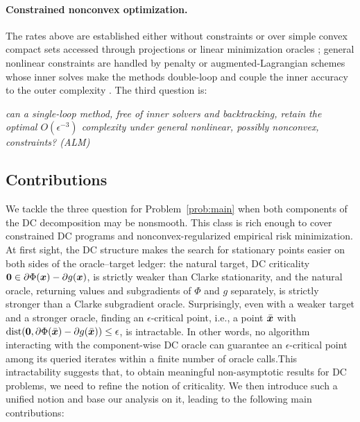 \documentclass[english]{article}
\begin{document}
\paragraph{Constrained nonconvex optimization.}
The rates above are established either without constraints or over
simple convex compact sets accessed through projections or linear
minimization oracles \citep{khamaru2018convergence,maskan2025}; general nonlinear
constraints are handled by penalty or augmented-Lagrangian schemes
whose inner solves make the methods double-loop and couple the inner
accuracy to the outer complexity
\citep{xie2021complexity,lu2022penalty,yu2021convergence,kanzow2025adaptive}. The third question is:

\emph{can a single-loop method, free of inner solvers and
backtracking, retain the optimal $O(\epsilon^{-3})$ complexity under general
nonlinear, possibly nonconvex, constraints? (ALM)}

\subsection{Contributions}
We tackle the three question for Problem~\eqref{prob:main} when both components of the DC decomposition may be nonsmooth.  This class is rich enough to cover
constrained DC programs and nonconvex-regularized empirical risk
minimization. At first sight, the DC structure makes the search for
stationary points easier on both sides of the oracle--target ledger:
the natural target, DC criticality
$\bm{0}\in\partial\Phi(\bm{x})-\partial g(\bm{x})$, is strictly weaker than
Clarke stationarity, and the natural oracle, returning values and
subgradients of $\Phi$ and $g$ separately, is strictly stronger than
a Clarke subgradient oracle. Surprisingly, even with a weaker target
and a stronger oracle, finding an $\epsilon$-critical point, i.e., a
point $\bar{\bm{x}}$ with
$\operatorname{dist}(\bm{0},\partial\Phi(\bar{\bm{x}})-\partial g(\bar{\bm{x}}))
\le\epsilon$, is intractable. In other words, no algorithm
interacting with the component-wise DC oracle can guarantee an
$\epsilon$-critical point among its queried iterates within a finite
number of oracle calls.This intractability suggests that, to obtain meaningful
non-asymptotic results for DC problems, we need to refine the notion
of criticality. We then introduce such a unified notion and base our analysis on
it, leading to the following main contributions:
\end{document}
